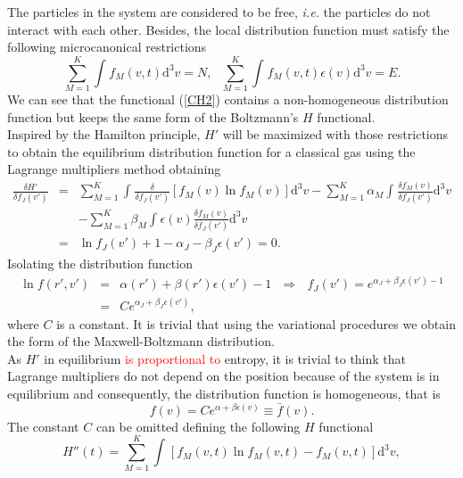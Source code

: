\documentclass{article}
\begin{document}
{\begin{equation}
\end{equation}
The particles in the system are considered to be free, \textit{i.e.} the particles do not interact with each other. Besides, the local distribution function must satisfy the following microcanonical restrictions 
\begin{equation}
    \sum_{M=1}^{K}\int_{}^{}f_M(v,t)\mathrm{d}^3v =N, \ \ \ \sum_{M=1}^{K}\int_{}^{}f_M(v,t)\epsilon(v)\mathrm{d}^3v =E \label{micro}.
\end{equation}
We can see that the functional (\ref{CH2}) contains a non-homogeneous distribution function but keeps the same form of the Boltzmann's $H$ functional.\\
Inspired by the Hamilton principle, $H'$ will be maximized with those restrictions to obtain the equilibrium distribution function for a classical gas using the Lagrange multipliers method obtaining}
\begin{eqnarray}
    \frac{\delta H'}{\delta f_J(v')}&=&\sum_{M=1}^{K}\int_{}^{}\frac{\delta}{\delta f_J(v')}\left[f_M(v)\ln f_M(v)  \right]\mathrm{d}^3v -\sum_{M=1}^{K}\alpha_M\int_{}^{}\frac{\delta f_M(v)}{\delta f_J(v')}\mathrm{d}^3v \nonumber \\
    &&-\sum_{M=1}^{K}\beta_M \int_{}^{}\epsilon(v)\frac{\delta f_M(v)}{\delta f_J(v')}\mathrm{d}^3v \nonumber \\
    &=&\ln f_J(v')+1-\alpha_J-\beta_J \epsilon(v')=0.
\end{eqnarray}
Isolating the distribution function 
\begin{eqnarray}
    \ln f(r',v')&=&\alpha(r')+\beta(r') \epsilon(v')-1 \ \ \  \Rightarrow \ \ \ f_J(v')=e^{\alpha_J +\beta_J \epsilon(v')-1} \nonumber \\
    &=&Ce^{\alpha_J+\beta_J \epsilon(v') } \label{relacion1},
\end{eqnarray}
where $C$ is a constant. It is trivial that using the variational procedures we obtain the form of the Maxwell-Boltzmann distribution. \\
As $H'$ in equilibrium \textcolor{red}{is proportional to} entropy, it is trivial to think that Lagrange multipliers do not depend on the position because of the system is in equilibrium and consequently, the distribution function is homogeneous, that is
\begin{equation}
    f(v)=Ce^{\alpha+\beta \epsilon(v)}\equiv \bar{f}(v).
\end{equation}{} 
The constant $C$ can be omitted defining the following $H$ functional
\begin{equation}
   H''(t)=\sum_{M=1}^{K}\int_{}^{} \left[f_M(v,t) \ln f_M(v,t)-f_M(v,t)\right]\mathrm{d}^3v  \label{CH3},
\end{equation}
\end{document}
